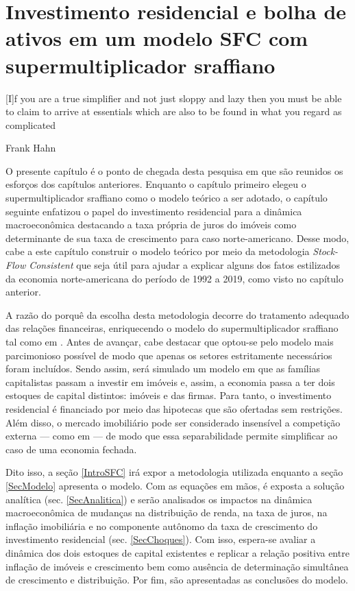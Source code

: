 \chapter{Investimento residencial e bolha de ativos em um modelo SFC com supermultiplicador sraffiano}\label{CapModelo}

\epigraph{[I]f you are a true simplifier and not just
sloppy and lazy then you must be able to claim to arrive at essentials which are also to be
found in what you regard as complicated}{Frank Hahn}

O presente capítulo é o ponto de chegada desta pesquisa em que são reunidos os esforços dos capítulos anteriores. Enquanto o capítulo primeiro elegeu o supermultiplicador sraffiano como o modelo teórico a ser adotado, o capítulo seguinte  enfatizou o papel do investimento residencial para a dinâmica macroeconômica destacando a taxa própria de juros do imóveis como determinante de sua taxa de crescimento para caso norte-americano. Desse modo, cabe a este capítulo construir o modelo teórico por meio da metodologia \textit{Stock-Flow Consistent}  que seja útil para ajudar a explicar alguns dos fatos estilizados da economia norte-americana do período de 1992 a 2019, como visto no capítulo anterior.

A razão do porquê da escolha desta metodologia decorre do tratamento adequado das relações financeiras, enriquecendo o modelo do supermultiplicador sraffiano tal como em \textcite{brochier_supermultiplier_2018}. Antes de avançar, cabe destacar que optou-se pelo modelo mais parcimonioso possível de modo que apenas os setores estritamente necessários foram incluídos. Sendo assim, será simulado um modelo em que as famílias capitalistas passam a investir em imóveis e, assim, a economia passa a ter dois estoques de capital distintos: imóveis e das firmas. Para tanto, o investimento residencial é financiado por meio das hipotecas que são ofertadas sem restrições. 
Além disso, o mercado imobiliário pode ser considerado insensível a competição externa --- como em \textcite{duesenberry_investment_1958} --- de modo que essa separabilidade permite simplificar ao caso de uma economia fechada.


Dito isso, a seção \ref{IntroSFC} irá expor a metodologia utilizada enquanto a seção \ref{SecModelo} apresenta o modelo. Com as equações em mãos, é exposta a solução analítica (sec. \ref{SecAnalitica}) e serão analisados os impactos na dinâmica macroeconômica de mudanças na distribuição de renda, na taxa de juros, na inflação imobiliária e no componente autônomo da taxa de crescimento do investimento residencial (sec. \ref{SecChoques}). Com isso, espera-se avaliar a dinâmica dos dois estoques de capital existentes e replicar a relação positiva entre inflação de imóveis e crescimento bem como ausência de determinação simultânea de crescimento e distribuição.
Por fim, são apresentadas as conclusões do modelo.






